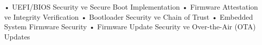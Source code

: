 • UEFI/BIOS Security ve Secure Boot Implementation
• Firmware Attestation ve Integrity Verification
• Bootloader Security ve Chain of Trust
• Embedded System Firmware Security
• Firmware Update Security ve Over-the-Air (OTA) Updates